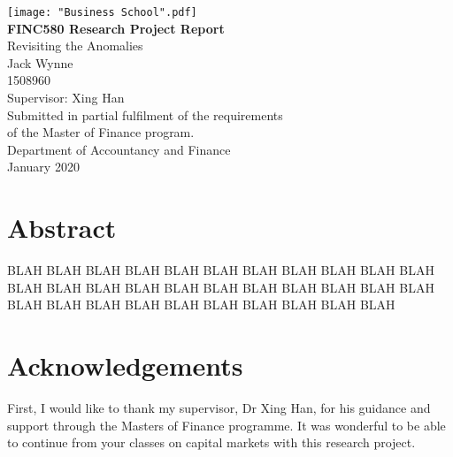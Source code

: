 \documentclass[12pt, a4paper, oneside]{article}
\begin{document}
\thispagestyle{empty}
\begin{center}

\vspace{-2em}\texttt{[image: "Business School".pdf]} \\
\vspace{0.9cm}
\Large \textbf{FINC580 Research Project Report} \\
\vspace{1.8cm}
\LARGE Revisiting the Anomalies
\\
\vspace{1.8cm}
\LARGE Jack Wynne \\
\Large 1508960 \\
\vspace{0.45cm}
\Large Supervisor: Xing Han \\
\vfill
\normalsize
Submitted in partial fulfilment of the requirements\\
of the Master of Finance program. \\
\vspace{0.45cm}
Department of Accountancy and Finance \\
\vspace{0.45cm}
January 2020
\vspace{2.7cm}
\end{center}

\raggedbottom
\pagebreak
\thispagestyle{plain}
\section*{\centering Abstract}
\vspace{0.45cm}
\doublespacing
BLAH BLAH BLAH BLAH BLAH BLAH BLAH BLAH BLAH BLAH BLAH BLAH BLAH BLAH BLAH BLAH BLAH BLAH BLAH BLAH BLAH BLAH BLAH BLAH BLAH BLAH BLAH BLAH BLAH BLAH BLAH BLAH 
\raggedbottom
\pagebreak

\thispagestyle{plain}
\section*{\centering Acknowledgements}
First, I would like to thank my supervisor, Dr Xing Han, for his guidance and support through the Masters of Finance programme. It was wonderful to be able to continue from your classes on capital markets with this research project.
\end{document}
